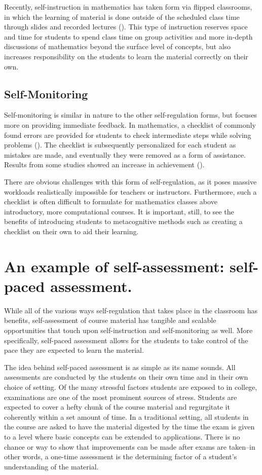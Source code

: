 Recently, self-instruction in mathematics has taken form via flipped classrooms, in which the learning of material is done outside of the scheduled class time through slides and recorded lectures (\cite{lage_inverting_2000}). This type of instruction reserves space and time for students to spend class time on group activities and more in-depth discussions of mathematics beyond the surface level of concepts, but also increases responsibility on the students to learn the material correctly on their own.

\subsection{Self-Monitoring}
Self-monitoring is similar in nature to the other self-regulation forms, but focuses more on providing immediate feedback. In mathematics, a checklist of commonly found errors are provided for students to check intermediate steps while solving problems (\cite{dunlap_custom}). The checklist is subsequently personalized for each student as mistakes are made, and eventually they were removed as a form of assistance. Results from some studies showed an increase in achievement (\cite{dunlap_ld}).

There are obvious challenges with this form of self-regulation, as it  poses massive workloads realistically impossible for teachers or instructors. Furthermore, such a checklist is often difficult to formulate for mathematics classes above introductory, more computational courses. It is important, still, to see the benefits of introducing students to metacognitive methods such as creating a checklist on their own to aid their learning.

\section{An example of self-assessment: self-paced assessment.}
While all of the various ways self-regulation that takes place in the classroom has benefits, self-assessment of course material has tangible and scalable opportunities that touch upon self-instruction and self-monitoring as well. More specifically, self-paced assessment allows for the students to take control of the pace they are expected to learn the material.

The idea behind self-paced assessment is as simple as its name sounds. All assessments are conducted by the students on their own time and in their own choice of setting. Of the many stressful factors students are exposed to in college, examinations are one of the most prominent sources of stress. Students are expected to cover a hefty chunk of the course material and regurgitate it coherently within a set amount of time. In a traditional setting, all students in the course are asked to have the material digested by the time the exam is given to a level where basic concepts can be extended to applications. There is no chance or way to show that improvements can be made after exams are taken--in other words, a one-time assessment is the determining factor of a student's understanding of the material.

